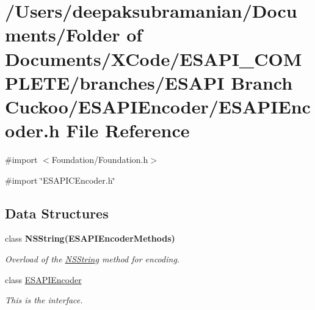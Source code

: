 \hypertarget{a00013}{
\section{/Users/deepaksubramanian/Documents/Folder of Documents/XCode/ESAPI\_\-COMPLETE/branches/ESAPI Branch Cuckoo/ESAPIEncoder/ESAPIEncoder.h File Reference}
\label{d7/dd4/a00013}
}
{\ttfamily \#import $<$Foundation/Foundation.h$>$}\par
{\ttfamily \#import \char`\"{}ESAPICEncoder.h\char`\"{}}\par
\subsection*{Data Structures}
\begin{DoxyCompactItemize}
\item 
class {\bfseries NSString(ESAPIEncoderMethods)}
\begin{DoxyCompactList}\small\item\em Overload of the \hyperlink{a00003}{NSString} method for encoding. \end{DoxyCompactList}\item 
class \hyperlink{a00001}{ESAPIEncoder}
\begin{DoxyCompactList}\small\item\em This is the interface. \end{DoxyCompactList}\end{DoxyCompactItemize}
